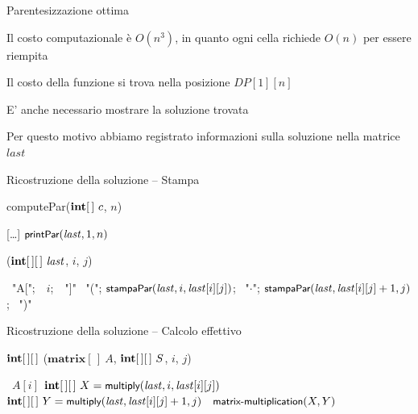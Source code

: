\begin{frame}{Parentesizzazione ottima}

\vspace{-9pt}
\begin{myboxtitle}[Considerazioni]
\BIL
\item Il costo computazionale è $O(n^3)$, in quanto ogni cella richiede $O(n)$ per essere riempita
\item Il costo della funzione si trova nella posizione $DP[1][n]$
\item E' anche necessario mostrare la soluzione trovata
\item Per questo motivo abbiamo registrato informazioni sulla soluzione nella matrice $\mathit{last}$
\EIL
\end{myboxtitle}

\end{frame}

\begin{frame}{Ricostruzione della soluzione -- Stampa}

\vspace{-9pt}
\begin{Procedure}
\caption[A]{\textsf{computePar}($\INTARRAY\ c$, \INTEGER $n$)}	
[\ldots]\;
$\textsf{{\small printPar}}(\mathit{last}, 1, n)$\;
\end{Procedure}


\begin{Procedure}
\caption[A]{($\INTARRAY[\,]\ \mathit{last}$, \INTEGER $i$, \INTEGER $j$)}
{ \PRINT\ "A[";\ \PRINT\ $i$;\ \PRINT\ "]"\; }
{
  \PRINT\ "("; 
  $\textsf{{\small stampaPar}}(\mathit{last}, i, \mathit{last}[i][j])$; 
  \PRINT\ "$\cdot$"; 
  $\textsf{{\small stampaPar}}(\mathit{last}, \mathit{last}[i][j]+1, j)$; 
  \PRINT\ ")"\;
}
\end{Procedure}

\end{frame}

\begin{frame}{Ricostruzione della soluzione -- Calcolo effettivo}

\vspace{-9pt}
\begin{Procedure}
\caption[A]{$\INTARRAY[\,]$ ($\mathbf{matrix}[\,]\ A$, $\INTARRAY[\,]\ S$, \INTEGER $i$, \INTEGER $j$)}
{ \Return\ $A[i]$\; }
{
  $\INTARRAY[\,]\ X = \fontproc{multiply}(\mathit{last}, i, \mathit{last}[i][j])$\;
  $\INTARRAY[\,]\ Y = \fontproc{multiply}(\mathit{last}, \mathit{last}[i][j]+1, j)$\;
  \Return\ $\textsf{{\small matrix-multiplication}}(X,Y)$\;
}
\end{Procedure}

\end{frame}

